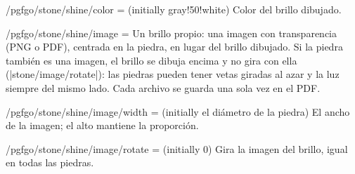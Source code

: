 \begin{key}{/pgfgo/stone/shine/color =  (initially gray!50!white)}
	Color del brillo dibujado.

	\begin{codeexample}[width=4cm]

		\begin{goban}
		\end{goban}
	\end{codeexample}
\end{key}

\begin{key}{/pgfgo/stone/shine/image = }
	Un brillo propio: una imagen con transparencia (PNG o PDF), centrada en la piedra, en lugar del brillo dibujado. Si la piedra también es una imagen, el brillo se dibuja encima y no gira con ella (|stone/image/rotate|): las piedras pueden tener vetas giradas al azar y la luz siempre del mismo lado. Cada archivo se guarda una sola vez en el PDF.

	\begin{codeexample}[]
		\begin{goban}[5, partial = B2:D4]
			\stones[w, image = {file = pgfgo-yunzi-white-1.png, rotate = random},
				shine = {true, image = {file = pgfgo-shine.png}}]{B2, C2, D2, B3, C3, D3}
		\end{goban}
	\end{codeexample}
\end{key}


\begin{key}{/pgfgo/stone/shine/image/width =  (initially el diámetro de la piedra)}
	El ancho de la imagen; el alto mantiene la proporción.
\end{key}

\begin{key}{/pgfgo/stone/shine/image/rotate =  (initially 0)}
	Gira la imagen del brillo, igual en todas las piedras.

	\begin{codeexample}[]
		\begin{goban}[5, partial = B2:D4]
			\stones[w, image = {file = pgfgo-yunzi-white-1.png},
				shine = {true, image = {file = pgfgo-shine.png, width = 0.3cm,
					rotate = 90}}]{B2:D3}
		\end{goban}
	\end{codeexample}
\end{key}

